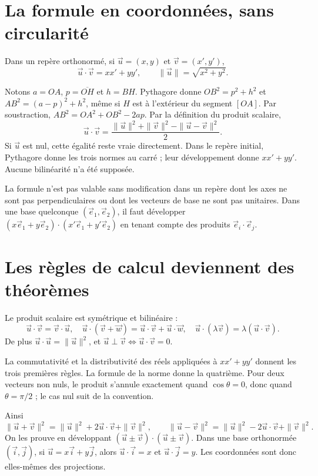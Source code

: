 \documentclass[../cours_1re.tex]{subfiles}
\begin{document}
\section{La formule en coordonnées, sans circularité}
\begin{propriete}
Dans un repère orthonormé, si $\vec u=(x,y)$ et $\vec v=(x',y')$,
\[
\vec u\cdot\vec v=xx'+yy',\qquad
\|\vec u\|=\sqrt{x^2+y^2}.
\]
\end{propriete}
\begin{demonstration}
Notons $a=OA$, $p=\overline{OH}$ et $h=BH$. Pythagore donne
$OB^2=p^2+h^2$ et $AB^2=(a-p)^2+h^2$, même si $H$ est à
l'extérieur du segment $[OA]$. Par soustraction,
$AB^2=OA^2+OB^2-2ap$. Par la définition du produit scalaire,
\[
\vec u\cdot\vec v=\frac{\|\vec u\|^2+\|\vec v\|^2-\|\vec u-\vec v\|^2}{2}.
\]
Si $\vec u$ est nul, cette égalité reste vraie directement.
Dans le repère initial, Pythagore donne les trois normes au carré ;
leur développement donne $xx'+yy'$. Aucune bilinéarité n'a été supposée.
\end{demonstration}
La formule n'est pas valable sans modification dans un repère dont les axes
ne sont pas perpendiculaires ou dont les vecteurs de base ne sont pas unitaires.
Dans une base quelconque $(\vec e_1,\vec e_2)$, il faut développer
$(x\vec e_1+y\vec e_2)\cdot(x'\vec e_1+y'\vec e_2)$ en tenant compte
des produits $\vec e_i\cdot\vec e_j$.

\section{Les règles de calcul deviennent des théorèmes}
\begin{propriete}
Le produit scalaire est symétrique et bilinéaire :
\[
\vec u\cdot\vec v=\vec v\cdot\vec u,\quad
\vec u\cdot(\vec v+\vec w)=\vec u\cdot\vec v+\vec u\cdot\vec w,\quad
\vec u\cdot(\lambda\vec v)=\lambda(\vec u\cdot\vec v).
\]
De plus $\vec u\cdot\vec u=\|\vec u\|^2$, et
$\vec u\perp\vec v\iff\vec u\cdot\vec v=0$.
\end{propriete}
\begin{demonstration}
La commutativité et la distributivité des réels appliquées à $xx'+yy'$
donnent les trois premières règles. La formule de la norme donne la quatrième.
Pour deux vecteurs non nuls, le produit s'annule exactement quand
$\cos\theta=0$, donc quand $\theta=\pi/2$ ; le cas nul suit de la convention.
\end{demonstration}
Ainsi
\[
\|\vec u+\vec v\|^2=\|\vec u\|^2+2\vec u\cdot\vec v+\|\vec v\|^2,
\qquad
\|\vec u-\vec v\|^2=\|\vec u\|^2-2\vec u\cdot\vec v+\|\vec v\|^2.
\]
On les prouve en développant $(\vec u\pm\vec v)\cdot(\vec u\pm\vec v)$.
Dans une base orthonormée $(\vec i,\vec j)$, si $\vec u=x\vec i+y\vec j$,
alors $\vec u\cdot\vec i=x$ et $\vec u\cdot\vec j=y$.
Les coordonnées sont donc elles-mêmes des projections.
\end{document}

